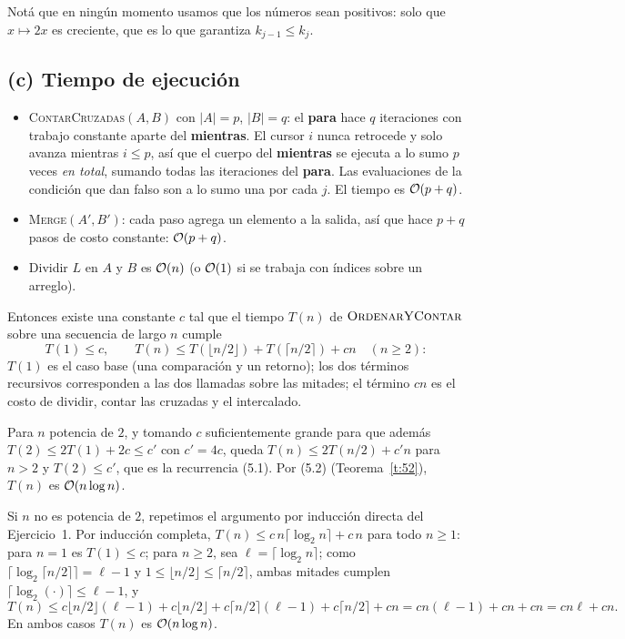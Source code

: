 Notá que en ningún momento usamos que los números sean positivos: solo que $x\mapsto 2x$
es creciente, que es lo que garantiza $k_{j-1}\le k_j$.

\subsection*{(c) Tiempo de ejecución}

\begin{itemize}
\item \textsc{ContarCruzadas}$(A,B)$ con $|A|=p$, $|B|=q$: el \textbf{para} hace $q$
iteraciones con trabajo constante aparte del \textbf{mientras}. El cursor $i$ nunca
retrocede y solo avanza mientras $i\le p$, así que el cuerpo del \textbf{mientras} se
ejecuta a lo sumo $p$ veces \emph{en total}, sumando todas las iteraciones del
\textbf{para}. Las evaluaciones de la condición que dan falso son a lo sumo una por cada
$j$. El tiempo es $\mathcal{O}(p+q)$.
\item \textsc{Merge}$(A',B')$: cada paso agrega un elemento a la salida, así que hace
$p+q$ pasos de costo constante: $\mathcal{O}(p+q)$.
\item Dividir $L$ en $A$ y $B$ es $\mathcal{O}(n)$ (o $\mathcal{O}(1)$ si se trabaja con índices sobre un
arreglo).
\end{itemize}
Entonces existe una constante $c$ tal que el tiempo $T(n)$ de
$\textsc{OrdenarYContar}$ sobre una secuencia de largo $n$ cumple
\[
T(1)\le c,\qquad T(n)\le T(\lfloor n/2\rfloor)+T(\lceil n/2\rceil)+cn\quad(n\ge 2):
\]
$T(1)$ es el caso base (una comparación y un retorno); los dos términos recursivos
corresponden a las dos llamadas sobre las mitades; el término $cn$ es el costo de
dividir, contar las cruzadas y el intercalado.

Para $n$ potencia de $2$, y tomando $c$ suficientemente grande para que además
$T(2)\le 2T(1)+2c\le c'$ con $c'=4c$, queda $T(n)\le 2T(n/2)+c'n$ para $n>2$ y
$T(2)\le c'$, que es la recurrencia (5.1). Por (5.2) (Teorema~\ref{t:52}), $T(n)$ es
$\mathcal{O}(n\log n)$.

Si $n$ no es potencia de $2$, repetimos el argumento por inducción directa del
Ejercicio~1. Por inducción completa, $T(n)\le c\,n\lceil\log_2 n\rceil+c\,n$ para todo
$n\ge1$: para $n=1$ es $T(1)\le c$; para $n\ge2$, sea $\ell=\lceil\log_2 n\rceil$; como
$\lceil\log_2\lceil n/2\rceil\rceil=\ell-1$ y $1\le\lfloor n/2\rfloor\le\lceil n/2\rceil$,
ambas mitades cumplen $\lceil\log_2(\cdot)\rceil\le \ell-1$, y
\[
T(n)\le c\lfloor n/2\rfloor(\ell-1)+c\lfloor n/2\rfloor+c\lceil n/2\rceil(\ell-1)
+c\lceil n/2\rceil+cn=cn(\ell-1)+cn+cn=cn\ell+cn.
\]
En ambos casos $T(n)$ es $\mathcal{O}(n\log n)$.

